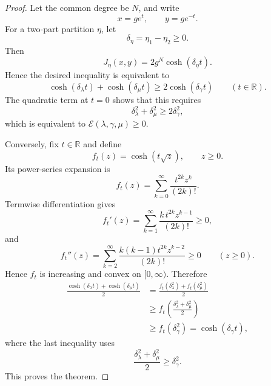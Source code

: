 \documentclass[11pt]{article}
\theoremstyle{definition}
\newcommand{\Energy}{\mathcal E}
\begin{document}
\begin{proof}
Let the common degree be \(N\), and write
\begin{equation*}
x=ge^t,
\qquad
y=ge^{-t}.
\end{equation*}
For a two-part partition \(\eta\), let
\begin{equation*}
\delta_\eta=\eta_1-\eta_2\ge0.
\end{equation*}
Then
\begin{equation*}
J_\eta(x,y)=2g^N\cosh(\delta_\eta t).
\end{equation*}
Hence the desired inequality is equivalent to
\begin{equation*}
\cosh(\delta_\lambda t)+\cosh(\delta_\mu t)
\ge2\cosh(\delta_\gamma t)
\qquad(t\in\mathbb R).
\end{equation*}
The quadratic term at \(t=0\) shows that this requires
\begin{equation*}
\delta_\lambda^2+\delta_\mu^2\ge2\delta_\gamma^2,
\end{equation*}
which is equivalent to \(\Energy(\lambda,\gamma,\mu)\ge0\).

Conversely, fix \(t\in\mathbb R\) and define
\begin{equation*}
f_t(z)=\cosh(t\sqrt z),
\qquad z\ge0.
\end{equation*}
Its power-series expansion is
\begin{equation*}
f_t(z)
=\sum_{k=0}^{\infty}\frac{t^{2k}z^k}{(2k)!}.
\end{equation*}
Termwise differentiation gives
\begin{equation*}
f_t'(z)
=\sum_{k=1}^{\infty}
\frac{k\,t^{2k}z^{k-1}}{(2k)!}
\ge0,
\end{equation*}
and
\begin{equation*}
f_t''(z)
=\sum_{k=2}^{\infty}
\frac{k(k-1)t^{2k}z^{k-2}}{(2k)!}
\ge0
\qquad(z\ge0).
\end{equation*}
Hence \(f_t\) is increasing and convex on \([0,\infty)\).  Therefore
\begin{align*}
\frac{\cosh(\delta_\lambda t)+\cosh(\delta_\mu t)}2
&=\frac{f_t(\delta_\lambda^2)+f_t(\delta_\mu^2)}2\\
&\ge
f_t\!\left(\frac{\delta_\lambda^2+\delta_\mu^2}{2}\right)\\
&\ge f_t(\delta_\gamma^2)
=\cosh(\delta_\gamma t),
\end{align*}
where the last inequality uses
\begin{equation*}
\frac{\delta_\lambda^2+\delta_\mu^2}{2}
\ge\delta_\gamma^2.
\end{equation*}
This proves the theorem.
\end{proof}
\end{document}
